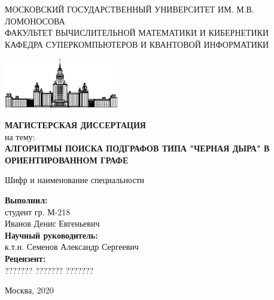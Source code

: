 \documentclass[12pt,a4paper,oneside,openany]{article}
\theoremstyle{definition}
\theoremstyle{lemma}
\theoremstyle{remark}
\begin{document}
\begin{titlepage}
        \begin{center}

        \bigskip

        \MakeTextUppercase{Московский государственный университет им. М.В. Ломоносова} \\

        \MakeTextUppercase{Факультет вычислительной математики и кибернетики} \\
        \MakeTextUppercase{Кафедра суперкомпьютеров и квантовой информатики} \\
        \bigskip

        \includegraphics[width=50mm]{msu.eps}

        \bigskip
        \bigskip
        \MakeTextUppercase{\textbf{\Huge Магистерская диссертация}} \\
        \bigskip
        {\large на тему:} \\
        \bigskip
        \MakeTextUppercase{\textbf{\large Алгоритмы поиска подграфов типа "черная дыра" в ориентированном графе}}

        \bigskip
        Шифр и наименование специальности

    \end{center}

    \bigskip
    \bigskip
    \bigskip
    \begin{flushright}
        \begin{minipage}{7cm}
            \textbf{Выполнил:} \\
            студент гр. М-218 \\
            Иванов Денис Евгеньевич \\

            \textbf{Научный руководитель:} \\
            к.т.н. Семенов Александр Сергеевич \\

            \textbf{Рецензент:} \\
            ??????? ??????? ???????
        \end{minipage}
    \end{flushright}

    \vfill

    \begin{center}
    {\large Москва, 2020}
    \end{center}

\end{titlepage}
\end{document}
